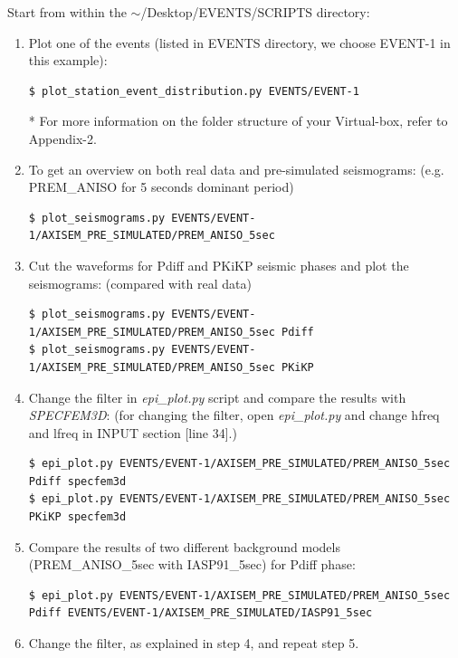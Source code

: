 \documentclass{article}
\begin{document}
Start from within the $\sim$/Desktop/EVENTS/SCRIPTS directory:

\begin{enumerate}
\item Plot one of the events (listed in EVENTS directory, we choose EVENT-1 in this example):

\begin{lstlisting}
$ plot_station_event_distribution.py EVENTS/EVENT-1
\end{lstlisting}
* For more information on the folder structure of your Virtual-box, refer to Appendix-2.

\item To get an overview on both real data and pre-simulated seismograms: (e.g. PREM\_ANISO 
for 5 seconds dominant period)
\begin{lstlisting}
$ plot_seismograms.py EVENTS/EVENT-1/AXISEM_PRE_SIMULATED/PREM_ANISO_5sec
\end{lstlisting}

\item Cut the waveforms for Pdiff and PKiKP seismic phases and plot the seismograms: 
(compared with real data)
\begin{lstlisting}
$ plot_seismograms.py EVENTS/EVENT-1/AXISEM_PRE_SIMULATED/PREM_ANISO_5sec Pdiff
$ plot_seismograms.py EVENTS/EVENT-1/AXISEM_PRE_SIMULATED/PREM_ANISO_5sec PKiKP
\end{lstlisting}

\item Change the filter in \textit{epi\_plot.py} script and compare the results with 
\textit{SPECFEM3D}: (for changing the filter, open \textit{epi\_plot.py }and change 
hfreq and lfreq in INPUT section [line 34].)

\begin{lstlisting}
$ epi_plot.py EVENTS/EVENT-1/AXISEM_PRE_SIMULATED/PREM_ANISO_5sec
Pdiff specfem3d
$ epi_plot.py EVENTS/EVENT-1/AXISEM_PRE_SIMULATED/PREM_ANISO_5sec
PKiKP specfem3d
\end{lstlisting}

\item Compare the results of two different background models (PREM\_ANISO\_5sec with 
IASP91\_5sec) for Pdiff phase:

\begin{lstlisting}
$ epi_plot.py EVENTS/EVENT-1/AXISEM_PRE_SIMULATED/PREM_ANISO_5sec
Pdiff EVENTS/EVENT-1/AXISEM_PRE_SIMULATED/IASP91_5sec
\end{lstlisting}

\item Change the filter, as explained in step 4, and repeat step 5.


\end{enumerate}
\end{document}
